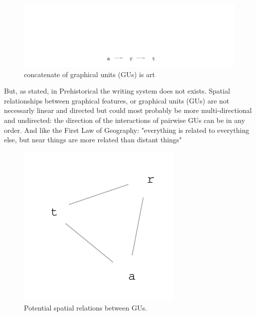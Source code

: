 \documentclass[article]{jss}\usepackage{knitr}
\begin{document}
\begin{figure}[H]

{\centering \includegraphics[width=\maxwidth]{figure/unnamed-chunk-1-1} 

}

\caption{\label{fig:figs}concatenate of graphical units (GUs) is art}\label{fig:unnamed-chunk-1}
\end{figure}



But, as stated, in Prehistorical the writing system does not exists. Spatial relationships between graphical features, or graphical units (GUs) are not necessarly linear and directed but could most probably be more multi-directional and undirected: the direction of the interactions of pairwise GUs can be in any order. And like the First Law of Geography: "everything is related to everything else, but near things are more related than distant things" \citep{Tobler70}

\begin{figure}[H]

{\centering \includegraphics[width=\maxwidth]{figure/unnamed-chunk-2-1} 

}

\caption{\label{fig:figs}Potential spatial relations between GUs.}\label{fig:unnamed-chunk-2}
\end{figure}
\end{document}
